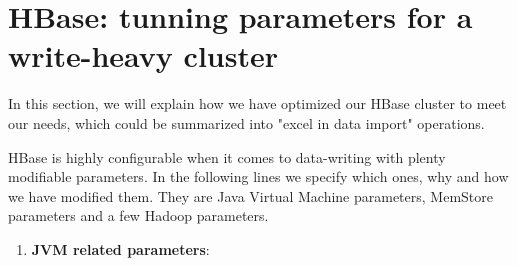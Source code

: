 \section{HBase: tunning parameters for a write-heavy cluster}

In this section, we will explain how we have optimized our HBase cluster to meet our needs, which could be summarized into "excel in data import" operations.
\par
HBase is highly configurable when it comes to data-writing with plenty modifiable parameters. In the following lines we specify which ones, why and how we have modified them. They are Java Virtual Machine parameters, MemStore parameters and a few Hadoop parameters.

\begin{enumerate}

\item \textbf{JVM related parameters}:
\bigskip


\end{enumerate}
